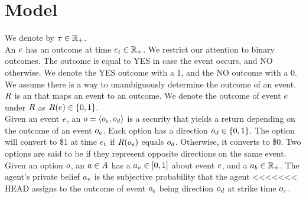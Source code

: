 \section{Model}

We denote  by $\tau\in\mathbb{R}_+$. \\

An  $e$ has an outcome at time $e_t \in \mathbb{R}_+$. 
We restrict our attention to binary outcomes. 
The outcome is equal to YES in case the event occurs, and NO otherwise. 
We denote the YES outcome with a 1, and the NO outcome with a 0.
We assume there is a way to unambiguously determine the outcome of an event. \\

$R$ is an  that maps an event to an outcome.
We denote the outcome of event $e$ under $R$ as 
$R(e) \in \{0,1\}$.\\

Given an event $e$, an  $o = \left<o_e, o_d\right>$ is a security that yields a return depending on 
the outcome of an event $o_e$. Each option has a direction 
$o_d \in \{0, 1\}$. 
The option will convert to \$1 at time $e_t$ if $R(o_e)$ equals 
$o_d$. Otherwise, it converts to \$0. Two options are said to be
 if they represent opposite directions on the same event.\\ 


Given an option $o$, an  $a\in A$ has a  
$a_v \in [0,1]$ about event $e$, and a  $a_b \in \mathbb{R}_+$.
The agent's private belief $a_v$ 
is the subjective probability that the agent
<<<<<<< HEAD
assigns to the outcome of event $o_e$ being direction $o_d$
at strike time $o_\tau$.\\

